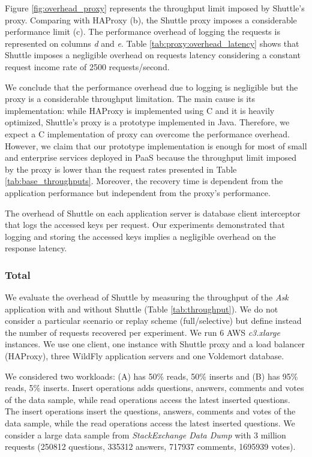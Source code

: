 Figure \ref{fig:overhead_proxy} represents the throughput limit imposed by Shuttle's proxy. Comparing with HAProxy (b), the Shuttle proxy imposes a considerable performance limit (c). The performance overhead of logging the requests is represented on columns \emph{d} and \emph{e}. Table \ref{tab:proxy:overhead_latency} shows that Shuttle imposes a negligible overhead on requests latency considering a constant request income rate of 2500 requests/second. 

We conclude that the performance overhead due to logging is negligible but the proxy is a considerable throughput limitation. The main cause is its implementation: while HAProxy is implemented using C and it is heavily optimized, Shuttle's proxy is a prototype implemented in Java. Therefore, we expect a C implementation of proxy can overcome the performance overhead. However, we claim that our prototype implementation is enough for most of small and enterprise services deployed in \ac{PaaS} because the throughput limit imposed by the proxy is lower than the request rates presented in Table \ref{tab:base_throughputs}. Moreover, the recovery time is dependent from the application performance but independent from the proxy's performance.   

The overhead of Shuttle on each application server is database client interceptor that logs the accessed keys per request. Our experiments demonstrated that logging and storing the accessed keys implies a negligible overhead on the response latency. 


\subsubsection{Total}\label{sec:eval:performance:total}
We evaluate the overhead of Shuttle by measuring the throughput of the \textit{Ask} application with and without Shuttle (Table \ref{tab:throughput}). We do not consider a particular scenario or replay scheme (full/selective) but define instead the number of requests recovered per experiment. We run 6 \ac{AWS} \textit{c3.xlarge} instances. We use one client, one instance with Shuttle proxy and a load balancer (HAProxy), three WildFly application servers and one Voldemort database.

We considered two workloads: (A) has 50\% reads, 50\% inserts and (B) has 95\% reads, 5\% inserts. Insert operations adds questions, answers, comments and votes of the data sample, while read operations access the latest inserted questions. The insert operations insert the questions, answers, comments and votes of the data sample, while the read operations access the latest inserted questions. We consider a large data sample from \textit{StackExchange Data Dump} \cite{stackexchange_data} with 3 million requests (250812 questions, 335312 answers, 717937 comments, 1695939 votes).

